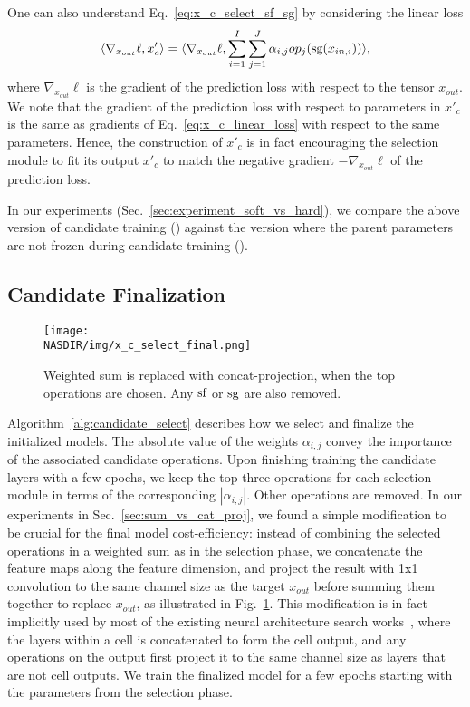 One can also understand Eq.~\ref{eq:x_c_select_sf_sg} by considering the linear loss
\begin{align}
   \langle \nabla_{x_{out}} \ell, x'_c \rangle =  
   \langle \nabla_{x_{out}} \ell, \sum _{i=1}^I \sum_{j=1}^J \alpha_{i,j} op_j( \textrm{sg}( x_{in,i} ) ) \rangle,
    \label{eq:x_c_linear_loss}
\end{align}
where $\nabla_{x_{out}} \ell$ is the gradient of the prediction loss with respect to the tensor $x_{out}$. We note that the gradient of the prediction loss with respect to parameters in $x'_c$ is the same as gradients of Eq.~\ref{eq:x_c_linear_loss} with respect to the same parameters. Hence, the construction of $x'_c$ is in fact encouraging the selection module to fit its output $x'_c$ to match the negative gradient $-\nabla_{x_{out}} \ell$ of the prediction loss.


In our experiments (Sec.~\ref{sec:experiment_soft_vs_hard}), we compare the above version of candidate training (\petridishhard) against the version where the parent parameters are not frozen during candidate training (\petridishsoft). 




\subsection{Candidate Finalization}
\label{sec:candidate_finalize}

\begin{figure}[t]
\centering
    \texttt{[image: \\NASDIR/img/x\_c\_select\_final.png]}
    \caption{Weighted sum is replaced with concat-projection, when the top operations are chosen. Any $\textrm{sf}$ or $\textrm{sg}$ are also removed.}
    \label{fig:x_c_select_final}
\end{figure}

Algorithm~\ref{alg:candidate_select} describes how we select and finalize the initialized models. 
The absolute value of the weights $\alpha_{i,j}$ convey the importance of the associated candidate operations. Upon finishing training the candidate layers with a few epochs, we keep the top three operations for each selection module in terms of the corresponding $| \alpha _{i,j} |$. 
Other operations are removed. In our experiments in Sec.~\ref{sec:sum_vs_cat_proj}, we found a simple modification to be crucial for the final model cost-efficiency: instead of combining the selected operations in a weighted sum as in the selection phase, we concatenate the feature maps along the feature dimension, and project the result with 1x1 convolution to the same channel size as the target $x_{out}$ before summing them together to replace $x_{out}$, as illustrated in Fig.~\ref{fig:x_c_select_final}. This modification is in fact implicitly used by most of the existing neural architecture search works~\citep{NASCell,Pham2018EfficientNA}, where the layers within a cell is concatenated to form the cell output, and any operations on the output first project it to the same channel size as layers that are not cell outputs. We train the finalized model for a few epochs starting with the parameters from the selection phase. 





